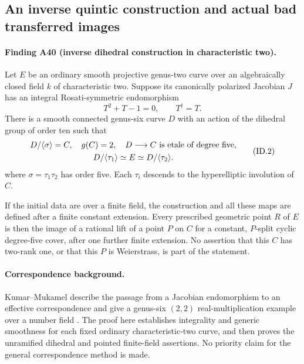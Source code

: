 \subsection{An inverse quintic construction and actual bad transferred images}

\paragraph{Finding A40 (inverse dihedral construction in characteristic two).}
Let $E$ be an ordinary smooth projective genus-two curve over an
algebraically closed field $k$ of characteristic two. Suppose its
canonically polarized Jacobian $J$ has an integral Rosati-symmetric
endomorphism
\[
                    T^2+T-1=0,\qquad T^\dagger=T.
 \tag{ID.1}
\]
There is a smooth connected genus-six curve $D$ with an action of
the dihedral group of order ten such that
\[
 \begin{gathered}
 D/\langle\sigma\rangle=C,\quad g(C)=2,\quad
 D\longrightarrow C\ \hbox{is etale of degree five},\\
 D/\langle\tau_1\rangle\simeq E\simeq D/\langle\tau_2\rangle.
 \end{gathered}
 \tag{ID.2}
\]
where $\sigma=\tau_1\tau_2$ has order five. Each $\tau_i$
descends to the hyperelliptic involution of $C$.

If the initial data are over a finite field, the construction and
all these maps are defined after a finite constant extension.
Every prescribed geometric point $R$ of $E$ is then the image of
a rational lift of a point $P$ on $C$ for a constant, $P$-split
cyclic degree-five cover, after one further finite extension.
No assertion that this $C$ has two-rank one, or that this $P$ is
Weierstrass, is part of the statement.

\paragraph{Correspondence background.}
Kumar--Mukamel describe the passage from a Jacobian endomorphism
to an effective correspondence and give a genus-six $(2,2)$
real-multiplication example over a number field
\cite[Sections~2--3, pp.~5--7]{KumarMukamel2016}.
The proof here establishes integrality and generic smoothness
for each fixed ordinary characteristic-two curve, and then
proves the unramified dihedral and pointed finite-field
assertions. No priority claim for the general correspondence
method is made.

